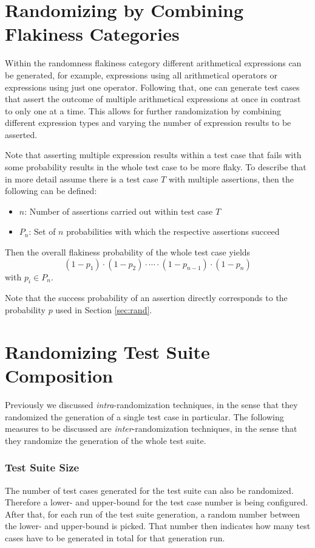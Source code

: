 \documentclass[
fancyheadings, %
%
%
]{stsreprt}
\begin{document}
\section{Randomizing by Combining Flakiness Categories}\label{sec:rand_by_comb}
Within the randomness flakiness category different arithmetical expressions can be generated, for example, expressions using all arithmetical operators or expressions using just one operator. 
Following that, one can generate test cases that assert the outcome of multiple arithmetical expressions at once in contrast to only one at a time.
This allows for further randomization by combining different expression types and varying the number of expression results to be asserted. \par
Note that asserting multiple expression results within a test case that fails with some probability results in the whole test case to be more flaky. 
To describe that in more detail assume there is a test case $T$ with multiple assertions, then the following can be defined:
\begin{itemize}
    \item $n$: Number of assertions carried out within test case $T$
    \item $P_n$: Set of $n$ probabilities with which the respective assertions succeed
\end{itemize}
Then the overall flakiness probability of the whole test case yields 
\[
    (1 - p_1) \cdot (1-p_2) \cdot \cdots \cdot (1-p_{n-1}) \cdot (1-p_{n})
\]
with $p_i \in P_n$. \par
Note that the success probability of an assertion directly corresponds to the probability $p$ used in Section \ref{sec:rand}.


\section{Randomizing Test Suite Composition}
Previously we discussed \textit{intra}-randomization techniques, in the sense that they randomized the generation of a single test case in particular. 
The following measures to be discussed are \textit{inter}-randomization techniques, in the sense that they randomize the generation of the whole test suite. \par

\subsubsection{Test Suite Size}
The number of test cases generated for the test suite can also be randomized. 
Therefore a lower- and upper-bound for the test case number is being configured.
After that, for each run of the test suite generation, a random number between the lower- and upper-bound is picked. 
That number then indicates how many test cases have to be generated in total for that generation run. 
\end{document}
